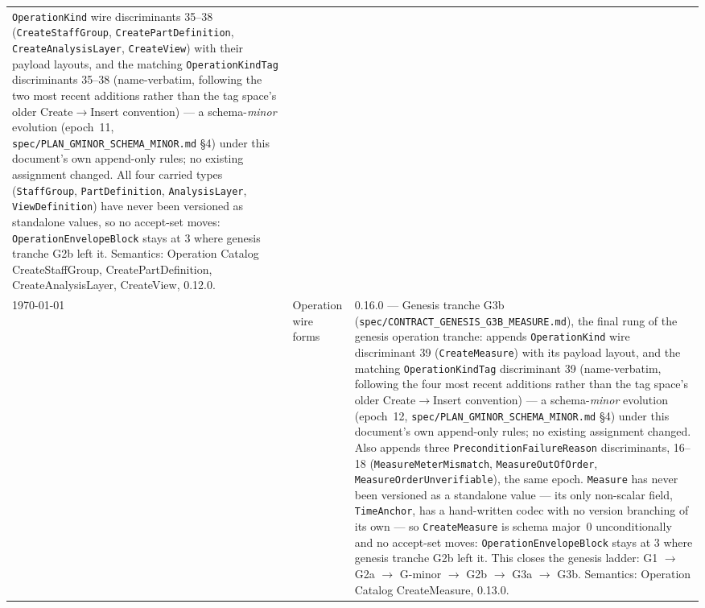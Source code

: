 \documentclass[11pt,letterpaper]{report}
\newcommand{\tablenums}[1]{{\addfontfeatures{Numbers={Lining,Tabular}}#1}}
\newcommand{\sectionsc}[1]{{\addfontfeatures{Letters=SmallCaps}#1}}
\begin{document}
\begin{longtable}{p{2cm} p{2.5cm} p{9cm}}
  \texttt{OperationKind} wire discriminants \tablenums{35}--\tablenums{38}
  (\texttt{CreateStaffGroup}, \texttt{CreatePartDefinition},
  \texttt{CreateAnalysisLayer}, \texttt{CreateView}) with their payload
  layouts, and the matching \texttt{OperationKindTag} discriminants
  \tablenums{35}--\tablenums{38} (name-verbatim, following the two most
  recent additions rather than the tag space's older Create$\rightarrow$Insert
  convention) --- a schema-\emph{minor} evolution (epoch~11,
  \texttt{spec/PLAN\_GMINOR\_SCHEMA\_MINOR.md} \S4) under this document's own
  append-only rules; no existing assignment changed. All four carried types
  (\texttt{StaffGroup}, \texttt{PartDefinition}, \texttt{AnalysisLayer},
  \texttt{ViewDefinition}) have never been versioned as standalone values, so
  no accept-set moves: \texttt{OperationEnvelopeBlock} stays at
  \tablenums{3} where genesis tranche G2b left it. Semantics: Operation
  Catalog \sectionsc{CreateStaffGroup}, \sectionsc{CreatePartDefinition},
  \sectionsc{CreateAnalysisLayer}, \sectionsc{CreateView}, 0.12.0. \\
    \today & Operation wire forms & 0.16.0 --- Genesis tranche G3b
  (\texttt{spec/CONTRACT\_GENESIS\_G3B\_MEASURE.md}), the final rung of the
  genesis operation tranche: appends \texttt{OperationKind} wire discriminant
  \tablenums{39} (\texttt{CreateMeasure}) with its payload layout, and the
  matching \texttt{OperationKindTag} discriminant \tablenums{39}
  (name-verbatim, following the four most recent additions rather than the
  tag space's older Create$\rightarrow$Insert convention) --- a
  schema-\emph{minor} evolution (epoch~12,
  \texttt{spec/PLAN\_GMINOR\_SCHEMA\_MINOR.md} \S4) under this document's own
  append-only rules; no existing assignment changed. Also appends three
  \texttt{PreconditionFailureReason} discriminants, \tablenums{16}--\tablenums{18}
  (\texttt{MeasureMeterMismatch}, \texttt{MeasureOutOfOrder},
  \texttt{MeasureOrderUnverifiable}), the same epoch. \texttt{Measure} has
  never been versioned as a standalone value --- its only non-scalar field,
  \texttt{TimeAnchor}, has a hand-written codec with no version branching of
  its own --- so \texttt{CreateMeasure} is schema major~0 unconditionally and
  no accept-set moves: \texttt{OperationEnvelopeBlock} stays at
  \tablenums{3} where genesis tranche G2b left it. This closes the genesis
  ladder: G1 $\rightarrow$ G2a $\rightarrow$ G-minor $\rightarrow$ G2b
  $\rightarrow$ G3a $\rightarrow$ G3b. Semantics: Operation Catalog
  \sectionsc{CreateMeasure}, 0.13.0. \\


\end{longtable}
\end{document}
